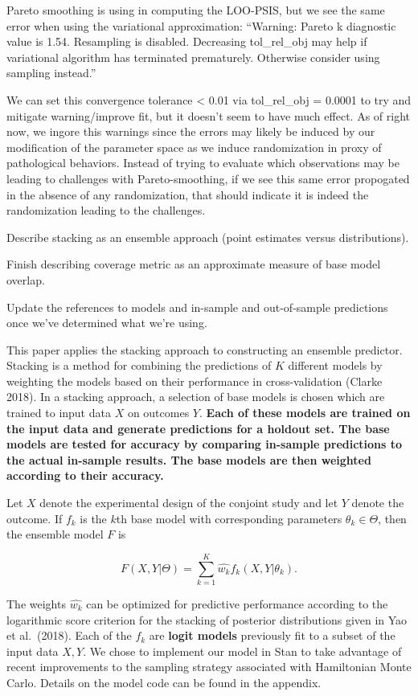 \documentclass[12pt,titlepage]{mktg-article}
\begin{document}
Pareto smoothing is using in computing the LOO-PSIS, but we see the same error when using the variational approximation: ``Warning: Pareto k diagnostic value is 1.54. Resampling is disabled. Decreasing tol\_rel\_obj may help if variational algorithm has terminated prematurely. Otherwise consider using sampling instead.''

We can set this convergence tolerance \textless{} 0.01 via tol\_rel\_obj = 0.0001 to try and mitigate warning/improve fit, but it doesn't seem to have much effect. As of right now, we ingore this warnings since the errors may likely be induced by our modification of the parameter space as we induce randomization in proxy of pathological behaviors. Instead of trying to evaluate which observations may be leading to challenges with Pareto-smoothing, if we see this same error propogated in the absence of any randomization, that should indicate it is indeed the randomization leading to the challenges.

Describe stacking as an ensemble approach (point estimates versus distributions).

Finish describing coverage metric as an approximate measure of base model overlap.

Update the references to models and in-sample and out-of-sample predictions once we've determined what we're using.

This paper applies the stacking approach to constructing an ensemble predictor. Stacking is a method for combining the predictions of \(K\) different models by weighting the models based on their performance in cross-validation (Clarke 2018). In a stacking approach, a selection of base models is chosen which are trained to input data \(X\) on outcomes \(Y\). \textbf{Each of these models are trained on the input data and generate predictions for a holdout set. The base models are tested for accuracy by comparing in-sample predictions to the actual in-sample results. The base models are then weighted according to their accuracy.}

Let \(X\) denote the experimental design of the conjoint study and let \(Y\) denote the outcome. If \(f_k\) is the \(k\)th base model with corresponding parameters \(\theta_k \in \Theta\), then the ensemble model \(F\) is

\[F(X,Y|\Theta) = \sum_{k=1}^K \hat{w_k} f_k(X, Y|\theta_k).\]

The weights \(\hat{w_k}\) can be optimized for predictive performance according to the logarithmic score criterion for the stacking of posterior distributions given in Yao et al.~(2018). Each of the \(f_k\) are \textbf{logit models} previously fit to a subset of the input data \(X,Y\). We chose to implement our model in Stan to take advantage of recent improvements to the sampling strategy associated with Hamiltonian Monte Carlo. Details on the model code can be found in the appendix.
\end{document}
